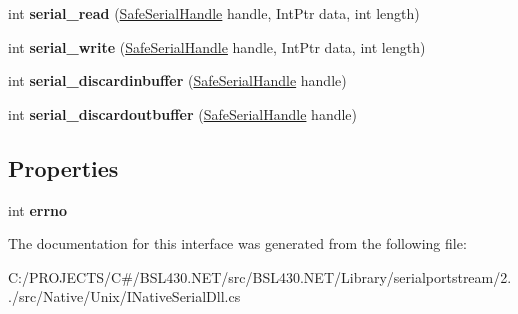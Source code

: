 \begin{DoxyCompactItemize}
int {\bfseries serial\+\_\+read} (\mbox{\hyperlink{class_r_j_c_p_1_1_i_o_1_1_ports_1_1_native_1_1_unix_1_1_safe_serial_handle}{Safe\+Serial\+Handle}} handle, Int\+Ptr data, int length)
\item 
\mbox{\label{interface_r_j_c_p_1_1_i_o_1_1_ports_1_1_native_1_1_unix_1_1_i_native_serial_dll_a93f5ca312cbc9056278033c2e6610845}} 
int {\bfseries serial\+\_\+write} (\mbox{\hyperlink{class_r_j_c_p_1_1_i_o_1_1_ports_1_1_native_1_1_unix_1_1_safe_serial_handle}{Safe\+Serial\+Handle}} handle, Int\+Ptr data, int length)
\item 
\mbox{\label{interface_r_j_c_p_1_1_i_o_1_1_ports_1_1_native_1_1_unix_1_1_i_native_serial_dll_ae30756704dc0405eb917127cfe27051b}} 
int {\bfseries serial\+\_\+discardinbuffer} (\mbox{\hyperlink{class_r_j_c_p_1_1_i_o_1_1_ports_1_1_native_1_1_unix_1_1_safe_serial_handle}{Safe\+Serial\+Handle}} handle)
\item 
\mbox{\label{interface_r_j_c_p_1_1_i_o_1_1_ports_1_1_native_1_1_unix_1_1_i_native_serial_dll_aa02a56443fbab1346556e15ba017d592}} 
int {\bfseries serial\+\_\+discardoutbuffer} (\mbox{\hyperlink{class_r_j_c_p_1_1_i_o_1_1_ports_1_1_native_1_1_unix_1_1_safe_serial_handle}{Safe\+Serial\+Handle}} handle)
\end{DoxyCompactItemize}
\subsection*{Properties}
\begin{DoxyCompactItemize}
\item 
\mbox{\label{interface_r_j_c_p_1_1_i_o_1_1_ports_1_1_native_1_1_unix_1_1_i_native_serial_dll_aa0a04394960ac6de13e74769c2e0fc86}} 
int {\bfseries errno}
\end{DoxyCompactItemize}


The documentation for this interface was generated from the following file\+:\begin{DoxyCompactItemize}
\item 
C\+:/\+P\+R\+O\+J\+E\+C\+T\+S/\+C\#/\+B\+S\+L430.\+N\+E\+T/src/\+B\+S\+L430.\+N\+E\+T/\+Library/serialportstream/2../src/\+Native/\+Unix/I\+Native\+Serial\+Dll.\+cs\end{DoxyCompactItemize}

